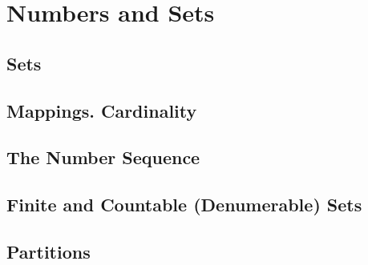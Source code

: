 \section{Numbers and Sets}

\subsection{Sets}

\subsection{Mappings. Cardinality}

\subsection{The Number Sequence}

\subsection{Finite and Countable (Denumerable) Sets}

\subsection{Partitions}